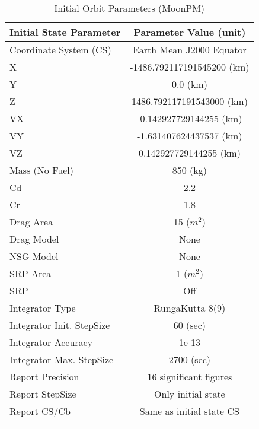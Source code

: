 \begin{table}[htbp!]
\centering \caption{Initial Orbit Parameters (MoonPM)}
      \begin{tabular}{lc}
      \hline\hline
            Initial State Parameter & Parameter Value (unit)\\
            \hline
            Coordinate System (CS) & Earth Mean J2000 Equator\\
            X & -1486.792117191545200 (km)\\
            Y & 0.0 (km)\\
            Z & 1486.792117191543000 (km)\\
            VX & -0.142927729144255 (km)\\
            VY & -1.631407624437537 (km)\\
            VZ & 0.142927729144255 (km)\\
            Mass (No Fuel) & 850 (kg)\\
            Cd & 2.2\\
            Cr & 1.8\\
            Drag Area & 15 ($m^2$)\\
            Drag Model & None\\
            NSG Model & None\\
            SRP Area & 1 ($m^2$)\\
            SRP & Off\\
            Integrator Type & RungaKutta 8(9)\\
            Integrator Init. StepSize & 60 (sec)\\
            Integrator Accuracy & 1e-13\\
            Integrator Max. StepSize & 2700 (sec)\\
            Report Precision & 16 significant figures\\
            Report StepSize & Only initial state\\
            Report CS/Cb & Same as initial state CS\\
      \hline\hline
      \label{Table: InitStopCondStateMoonPM}
\end{tabular}
\end{table}

